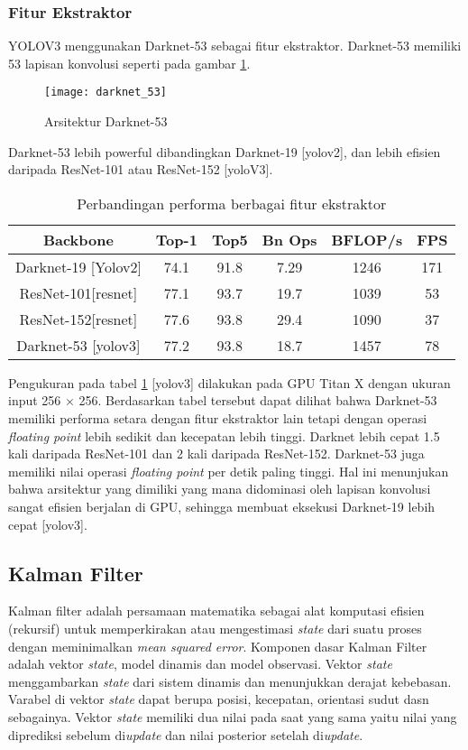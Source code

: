 \documentclass[../thesis.tex]{subfiles}
\begin{document}
\subsubsection{Fitur Ekstraktor}
YOLOV3 menggunakan Darknet-53 sebagai fitur ekstraktor. Darknet-53 memiliki 53 lapisan konvolusi seperti pada gambar \ref{darknet_53}.
\begin{figure}[htp]
	\centering
	\texttt{[image: darknet\_53]}
	\caption{Arsitektur Darknet-53}
	\label{darknet_53}
\end{figure}
Darknet-53 lebih powerful dibandingkan Darknet-19 [yolov2], dan lebih efisien daripada ResNet-101 atau ResNet-152 [yoloV3].

\begin{table}[htp]
\centering
\begin{tabular}{ cccccc } 
	Backbone & Top-1 & Top5 & Bn Ops & BFLOP/s & FPS\\
	\hline
	Darknet-19 [Yolov2]& 74.1& 91.8& 7.29& 1246 & 171\\
	ResNet-101[resnet] & 77.1& 93.7& 19.7& 1039 & 53 \\
	ResNet-152[resnet] & 77.6& 93.8 &29.4& 1090 & 37 \\
	Darknet-53 [yolov3] &77.2& 93.8&18.7& 1457 & 78 \\
\end{tabular}
\caption{Perbandingan performa berbagai fitur ekstraktor}
\label{tabel_comp_FE}
\end{table}
Pengukuran pada tabel \ref{tabel_comp_FE} [yolov3] dilakukan pada GPU Titan X dengan ukuran input 256 × 256. Berdasarkan tabel tersebut dapat dilihat bahwa Darknet-53 memiliki performa setara dengan fitur ekstraktor lain tetapi dengan operasi \textit{floating point} lebih sedikit dan kecepatan lebih tinggi. Darknet lebih cepat 1.5 kali daripada ResNet-101 dan 2 kali daripada ResNet-152.
Darknet-53 juga memiliki nilai operasi \textit{floating point} per detik paling tinggi. Hal ini menunjukan bahwa arsitektur yang dimiliki yang mana didominasi oleh lapisan konvolusi sangat efisien berjalan di GPU, sehingga membuat eksekusi Darknet-19 lebih cepat [yolov3].

\subsection{Kalman Filter}

Kalman filter adalah persamaan matematika sebagai alat komputasi efisien (rekursif) untuk memperkirakan atau mengestimasi \textit{state} dari suatu proses dengan meminimalkan \textit{mean squared error}.
Komponen dasar Kalman Filter adalah vektor \textit{state}, model dinamis dan model observasi.
Vektor \textit{state} menggambarkan \textit{state} dari sistem dinamis dan menunjukkan derajat kebebasan. Varabel di vektor \textit{state} dapat berupa posisi, kecepatan, orientasi sudut dasn sebagainya. Vektor \textit{state} memiliki dua nilai pada saat yang sama yaitu 
nilai yang diprediksi sebelum di\textit{update} dan nilai posterior setelah di\textit{update}.
\end{document}
